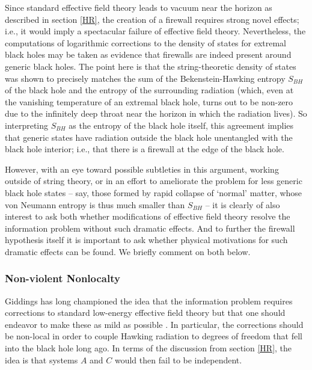 \documentclass[12pt]{article}
\begin{document}
Since standard effective field theory leads to vacuum near the horizon as described in section \ref{HR}, the creation of a firewall requires strong novel effects; i.e., it would imply a spectacular failure of effective field theory.  Nevertheless, the computations \cite{Banerjee:2011jp,Sen:2011ba,Sen:2012cj,Bhattacharyya:2012ye} of logarithmic corrections to the density of states for extremal black holes may be taken as evidence that firewalls are indeed present around generic black holes.  The point here is that the string-theoretic density of states was shown to precisely matches the sum of the Bekenstein-Hawking entropy $S_{BH}$ of the black hole and the entropy of the surrounding radiation (which, even at the vanishing temperature of an extremal black hole, turns out to be non-zero due to the infinitely deep throat near the horizon in which the radiation lives).  So interpreting $S_{BH}$ as the entropy of the black hole itself, this agreement implies that generic states have radiation outside the black hole unentangled with the black hole interior; i.e., that there is a firewall at the edge of the black hole.


However, with an eye toward possible subtleties in this argument, working outside of string theory, or in an effort to ameliorate the problem for less generic black hole states -- say, those formed by rapid collapse of `normal' matter, whose von Neumann entropy is thus much smaller than $S_{BH}$ --
 it is clearly of also interest to ask both whether modifications of effective field theory resolve the information problem without such dramatic effects.  And to further the firewall hypothesis itself it is important to ask whether physical motivations for such dramatic effects can be found.  We briefly comment on both below.

\subsubsection{Non-violent Nonlocalty}
\label{NVNL}

Giddings has long championed the idea that the information problem requires corrections to standard low-energy effective field theory but that one should endeavor to make these as mild as possible \cite{Giddings:2011ks,Giddings:2012gc,Giddings:2013kcj}.  In particular, the corrections should be non-local in order to couple Hawking radiation to degrees of freedom that fell into the black hole long ago.  In terms of the discussion from section \ref{HR}, the idea is that systems $A$ and $C$ would then fail to be independent.
\end{document}

